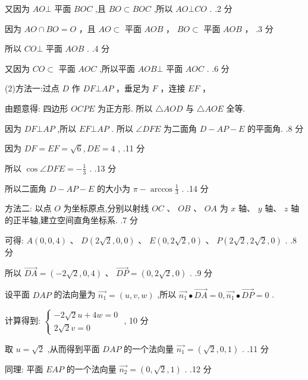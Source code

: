 \documentclass[10pt]{article}
\begin{document}
又因为 \({AO} \bot\) 平面 \({BOC}\) ,且 \({BO} \subset  {BOC}\) ,所以 \({AO} \bot  {CO}\) . .2 分

因为 \({AO} \cap  {BO} = O\) ，且 \({AO} \subset\) 平面 \({AOB}\) ， \({BO} \subset\) 平面 \({AOB}\) ， .3 分

所以 \({CO}\bot\) 平面 \({AOB}\) . .4 分

又因为 \({CO} \subset\) 平面 \({AOC}\) ,所以平面 \({AOB} \bot\) 平面 \({AOC}\) . .6 分

(2)方法一:过点 \(D\) 作 \({DF}\bot {AP}\) ，垂足为 \(F\) ，连接 \({EF}\) ，

由题意得: 四边形 \({OCPE}\) 为正方形. 所以 \(\bigtriangleup {AOD}\) 与 \(\bigtriangleup {AOE}\) 全等.

因为 \({DF} \bot  {AP}\) ,所以 \({EF} \bot  {AP}\) . 所以 \(\angle {DFE}\) 为二面角 \(D - {AP} - E\) 的平面角. .8 分

因为 \({DF} = {EF} = \sqrt{6},{DE} = 4\) , .11 分

所以 \(\cos \angle {DFE} =  - \frac{1}{3}\) . .13 分

所以二面角 \(D - {AP} - E\) 的大小为 \(\pi  - \arccos \frac{1}{3}\) . .14 分

方法二: 以点 \(O\) 为坐标原点,分别以射线 \({OC}\text{ 、 }{OB}\text{ 、 }{OA}\) 为 \(x\) 轴、 \(y\) 轴、 \(z\) 轴的正半轴,建立空间直角坐标系. .7 分

可得: \(A\left( {0,0,4}\right) \text{ 、 }D\left( {2\sqrt{2},0,0}\right) \text{ 、 }E\left( {0,2\sqrt{2},0}\right) \text{ 、 }P\left( {2\sqrt{2},2\sqrt{2},0}\right)\) . .8 分

所以 \(\overrightarrow{DA} = \left( {-2\sqrt{2},0,4}\right) \text{ 、 }\overrightarrow{DP} = \left( {0,2\sqrt{2},0}\right)\) . .9 分

设平面 \({DAP}\) 的法向量为 \(\overrightarrow{{n}_{1}} = \left( {u,v,w}\right)\) ,所以 \(\overrightarrow{{n}_{1}} \bullet  \overrightarrow{DA} = 0,\overrightarrow{{n}_{1}} \bullet  \overrightarrow{DP} = 0\) .

计算得到: \(\left\{  \begin{matrix}  - 2\sqrt{2}u + {4w} = 0 \\  2\sqrt{2}v = 0 \end{matrix}\right.\) , 10 分

取 \(u = \sqrt{2}\) ,从而得到平面 \({DAP}\) 的一个法向量 \(\overrightarrow{{n}_{1}} = \left( {\sqrt{2},0,1}\right)\) . .11 分

同理: 平面 \({EAP}\) 的一个法向量 \(\overrightarrow{{n}_{2}} = \left( {0,\sqrt{2},1}\right)\) . .12 分
\end{document}

